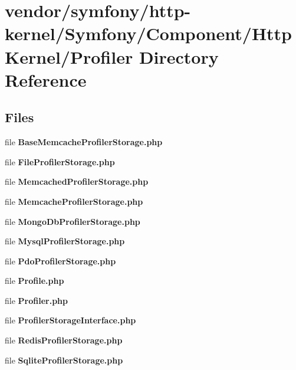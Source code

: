 \section{vendor/symfony/http-\/kernel/\+Symfony/\+Component/\+Http\+Kernel/\+Profiler Directory Reference}
\label{dir_ab98f9a2d1b00c7f52f2d5fba28bd32c}
\subsection*{Files}
\begin{DoxyCompactItemize}
\item 
file {\bf Base\+Memcache\+Profiler\+Storage.\+php}
\item 
file {\bf File\+Profiler\+Storage.\+php}
\item 
file {\bf Memcached\+Profiler\+Storage.\+php}
\item 
file {\bf Memcache\+Profiler\+Storage.\+php}
\item 
file {\bf Mongo\+Db\+Profiler\+Storage.\+php}
\item 
file {\bf Mysql\+Profiler\+Storage.\+php}
\item 
file {\bf Pdo\+Profiler\+Storage.\+php}
\item 
file {\bf Profile.\+php}
\item 
file {\bf Profiler.\+php}
\item 
file {\bf Profiler\+Storage\+Interface.\+php}
\item 
file {\bf Redis\+Profiler\+Storage.\+php}
\item 
file {\bf Sqlite\+Profiler\+Storage.\+php}
\end{DoxyCompactItemize}

